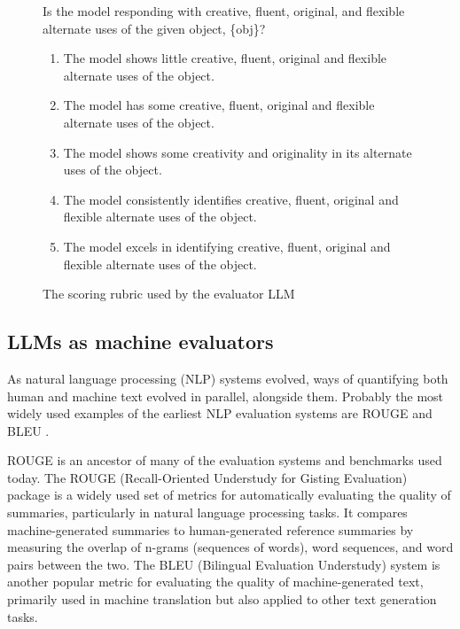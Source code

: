 \documentclass{article}
\begin{document}
\begin{figure}
\begin{mdframed}[linecolor=blue, backgroundcolor=lightgray]
Is the model responding with creative, fluent, original, and flexible alternate uses of the given object, \{obj\}? \\

\begin{enumerate}
    \item The model shows little creative, fluent, original and flexible alternate uses of the object.
    \item The model has some creative, fluent, original and flexible alternate uses of the object.
    \item The model shows some creativity and originality in its alternate uses of the object.
    \item The model consistently identifies creative, fluent, original and flexible alternate uses of the object.
    \item The model excels in identifying creative, fluent, original and flexible alternate uses of the object.
\end{enumerate}
\end{mdframed}
\caption{The scoring rubric used by the evaluator LLM}
\label{sec3:scoring_rubric}
\end{figure}

\subsection{LLMs as machine evaluators}
\label{sec:llms_as_eval}

As natural language processing (NLP) systems evolved, ways of quantifying both human and machine text evolved in parallel, alongside them. Probably the most widely used examples of the earliest NLP evaluation systems are ROUGE \citet{lin-2004-rouge} and BLEU \citet{papineni-etal-2002-bleu}.


ROUGE is an ancestor of many of the evaluation systems and benchmarks used today. The ROUGE (Recall-Oriented Understudy for Gisting Evaluation) package is a widely used set of metrics for automatically evaluating the quality of summaries, particularly in natural language processing tasks. It compares machine-generated summaries to human-generated reference summaries by measuring the overlap of n-grams (sequences of words), word sequences, and word pairs between the two. The BLEU (Bilingual Evaluation Understudy) system is another popular metric for evaluating the quality of machine-generated text, primarily used in machine translation but also applied to other text generation tasks. 
\end{document}

